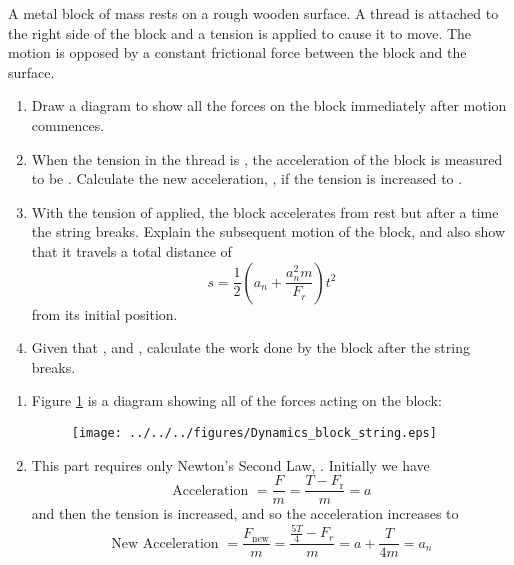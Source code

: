 
\begin{problem}[A1987PSIIQ9a] %
{A metal block of mass  rests on a rough wooden surface. A thread is attached to the right side of the block and a tension is applied to cause it to move. The motion is opposed by a constant frictional force  between the block and the surface.
\begin{enumerate}
	\item Draw a diagram to show all the forces on the block immediately after motion commences.
	\item When the tension in the thread is , the acceleration of the block is measured to be . Calculate the new acceleration, , if the tension is increased to .
	\item With the tension of  applied, the block accelerates from rest but after a time  the string breaks. Explain the subsequent motion of the block, and also show that it travels a total distance of 
	\begin{equation*} 
	s = \frac{1}{2} \left(a_{n} + \frac{a_{n}^{2}m}{F_{r}} \right)t^{2}
	\end{equation*} 
	from its initial position.
	\item Given that  ,  and , calculate the work done by the block after the string breaks.
\end{enumerate}
}
{}
{\begin{enumerate}
	\item Figure \ref{fig:Dynamics_block_string} is a diagram showing all of the forces acting on the block:
\begin{figure}[h]
\centering
\texttt{[image: ../../../figures/Dynamics\_block\_string.eps]}
\caption{}
\label{fig:Dynamics_block_string}
\end{figure}
	\item This part requires only Newton's Second Law, . Initially we have 
	\begin{equation*} 
	\text{Acceleration } = \frac{F}{m} = \frac{T - F_{\text{r}}}{m} = a 
	\end{equation*}
and then the tension is increased, and so the acceleration increases to
	\begin{equation*}
	 \text{New Acceleration } = \frac{F_{\text{new}}}{m} = \frac{\frac{5T}{4} - F_r}{m} = a + \frac{T}{4m} = a_{n} 
	 \end{equation*}
	

\end{enumerate}}
\end{problem}
